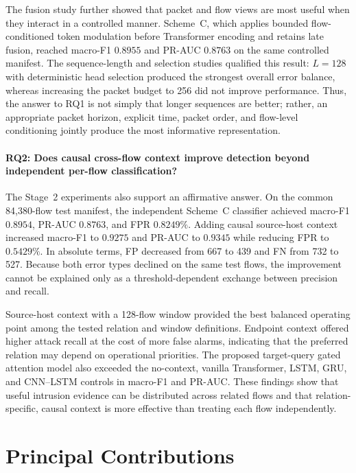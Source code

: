 \documentclass[11pt,fleqn]{report}
\begin{document}
The fusion study further showed that packet and flow views are most useful when
they interact in a controlled manner. Scheme~C, which applies bounded
flow-conditioned token modulation before Transformer encoding and retains late
fusion, reached macro-F1 $0.8955$ and PR-AUC $0.8763$ on the same controlled
manifest. The sequence-length and selection studies qualified this result:
$L=128$ with deterministic head selection produced the strongest overall error
balance, whereas increasing the packet budget to 256 did not improve
performance. Thus, the answer to RQ1 is not simply that longer sequences are
better; rather, an appropriate packet horizon, explicit time, packet order, and
flow-level conditioning jointly produce the most informative representation.

\paragraph{RQ2: Does causal cross-flow context improve detection beyond
independent per-flow classification?}
The Stage~2 experiments also support an affirmative answer. On the common
84,380-flow test manifest, the independent Scheme~C classifier achieved
macro-F1 $0.8954$, PR-AUC $0.8763$, and FPR $0.8249\%$. Adding causal
source-host context increased macro-F1 to $0.9275$ and PR-AUC to $0.9345$ while
reducing FPR to $0.5429\%$. In absolute terms, FP decreased from 667 to 439 and
FN from 732 to 527. Because both error types declined on the same test flows,
the improvement cannot be explained only as a threshold-dependent exchange
between precision and recall.

Source-host context with a 128-flow window provided the best balanced operating
point among the tested relation and window definitions. Endpoint context
offered higher attack recall at the cost of more false alarms, indicating that
the preferred relation may depend on operational priorities. The proposed
target-query gated attention model also exceeded the no-context, vanilla
Transformer, LSTM, GRU, and CNN--LSTM controls in macro-F1 and PR-AUC. These
findings show that useful intrusion evidence can be distributed across related
flows and that relation-specific, causal context is more effective than treating
each flow independently.

\section{Principal Contributions}
\label{subsec:conclusion_contributions}
\end{document}
